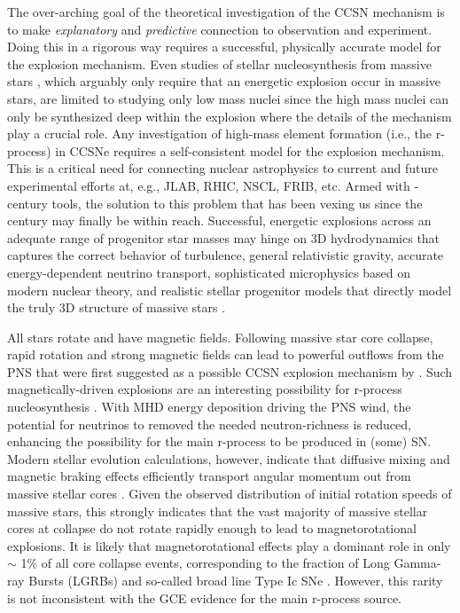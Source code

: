 The over-arching goal of the theoretical investigation of the CCSN mechanism is to make {\it explanatory} and {\it predictive} connection to observation and experiment.
Doing this in a rigorous way requires a successful, physically accurate model for the explosion mechanism.
Even studies of stellar nucleosynthesis from massive stars \citep[e.g.,][]{Woosley:1995, Woosley:2007d}, which arguably only require that an energetic explosion occur in massive stars, are limited to studying only low mass nuclei since the high mass nuclei can only be synthesized deep within the explosion where the details of the mechanism play a crucial role.
Any investigation of high-mass element formation (i.e., the r-process) in CCSNe requires a self-consistent model for the explosion mechanism.
This is a critical need for connecting nuclear astrophysics to current and future experimental efforts at, e.g., JLAB, RHIC, NSCL, FRIB, etc.
Armed with -century tools, the solution to this problem that has been vexing us since the  century may finally be within reach.
Successful, energetic explosions across an adequate range of progenitor star masses may hinge on 3D hydrodynamics that captures the correct behavior of turbulence, general relativistic gravity, accurate energy-dependent neutrino transport, sophisticated microphysics based on modern nuclear theory, and realistic stellar progenitor models that directly model the truly 3D structure of massive stars \citep[e.g.,][]{Meakin:2007, Arnett:2011, Couch:2015a}.



All stars rotate and have magnetic fields.
Following massive star core collapse, rapid rotation and strong magnetic fields can lead to powerful outflows from the PNS \citep{Wheeler:2000, Wheeler:2002, Burrows:2007, Winteler:2012} that were first suggested as a possible CCSN explosion mechanism by \citet{LeBlanc:1970}.
Such magnetically-driven explosions are an interesting possibility for r-process nucleosynthesis \citep{Winteler:2012}.
With MHD energy deposition driving the PNS wind, the potential for neutrinos to removed the needed neutron-richness is reduced, enhancing the possibility for the main r-process to be produced in (some) SN.
Modern stellar evolution calculations, however, indicate that diffusive mixing and magnetic braking effects efficiently transport angular momentum out from massive stellar cores \citep{Spruit:2002, Heger:2005, Paxton:2013}.
Given the observed distribution of initial rotation speeds of massive stars, this strongly indicates that the vast majority of massive stellar cores at collapse do not rotate rapidly enough to lead to magnetorotational explosions.
It is likely that magnetorotational effects play a dominant role in only $\sim$ 1\% of all core collapse events, corresponding to the fraction of Long Gamma-ray Bursts (LGRBs) and so-called broad line Type Ic SNe \citep{Modjaz:2016}.
However, this rarity is not inconsistent with the GCE evidence for the main r-process source.

